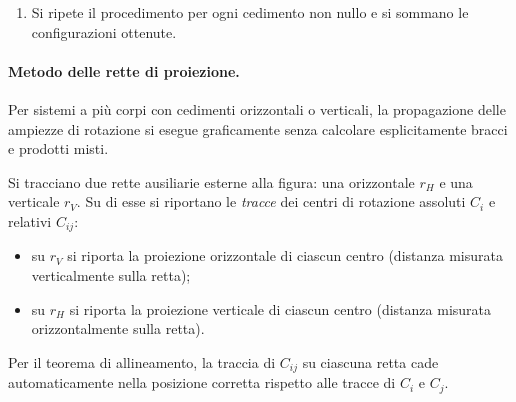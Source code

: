 \begin{enumerate}[label=(\arabic*), leftmargin=*,
	itemsep=4pt]
	\smallskip
	\noindent\textit{Vincolo semplice interno} (tra $\mathcal{C}_i$ e
	$\mathcal{C}_j$, con asse $\ab_k$ nel punto $A_k$). La
	prestazione coinvolge lo spostamento relativo:
	$[\ub_j(A_k)-\ub_i(A_k)]\cdot\ab_k = s_k$.
	Lo spostamento relativo di $A_k$ è quello di un punto che
	ruota attorno al \CRr\ $C_{ij}$ con rotazione relativa
	$\vartheta_{ij} = \vartheta_j - \vartheta_i$; la sua
	ampiezza e il suo segno si ricavano da:
	\begin{equation}\label{eq:ampiezza_interno}
		\vartheta_{ij} =
		\frac{s_k}
		{\bigl(\overrightarrow{C_{ij}A_k}\times\ab_k\bigr)
			\cdot\ab_z}.
	\end{equation}
	Le rotazioni assolute si ricavano da $\vartheta_{ij} =
	\vartheta_j - \vartheta_i$ e dalla relazione
	():
	\begin{equation}\label{eq:rapporto_rotazioni}
		\frac{\vartheta_j}{\vartheta_i} =
		-\frac{\overrightarrow{C_i C_{ij}}}
		{\overrightarrow{C_j C_{ij}}},
	\end{equation}
	dove i vettori sono misurati lungo la retta orientata
	$C_i \to C_j$: il segno del rapporto è negativo se
	$C_{ij}$ è interno al segmento (rotazioni discordi),
	positivo se esterno (rotazioni concordi).
	
	
	\item Si ripete il procedimento per ogni cedimento non nullo e si
	sommano le configurazioni ottenute.
	
\end{enumerate}


\paragraph{Metodo delle rette di proiezione.}
Per sistemi a più corpi con cedimenti orizzontali o verticali,
la propagazione delle ampiezze di rotazione si esegue
graficamente senza calcolare esplicitamente bracci e prodotti
misti.

Si tracciano due rette ausiliarie esterne alla figura: una
orizzontale $r_H$ e una verticale $r_V$. Su di esse si
riportano le \emph{tracce} dei centri di rotazione assoluti
$C_i$ e relativi $C_{ij}$:
\begin{itemize}[noitemsep]
	\item su $r_V$ si riporta la proiezione orizzontale di
	ciascun centro (distanza misurata verticalmente sulla
	retta);
	\item su $r_H$ si riporta la proiezione verticale di
	ciascun centro (distanza misurata orizzontalmente sulla
	retta).
\end{itemize}
Per il teorema di allineamento, la traccia di $C_{ij}$ su
ciascuna retta cade automaticamente nella posizione corretta
rispetto alle tracce di $C_i$ e $C_j$.

